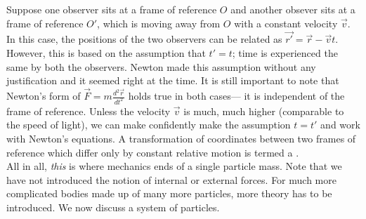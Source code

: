Suppose one observer sits at a frame of reference $O$ and another obsever sits at a frame of reference $O'$, which is moving away from $O$ with a constant velocity $\vec{v}$. In this case, the positions of the two observers can be related as $\vec{r'} = \vec{r} - \vec{v}t$. However, this is based on the assumption that $t' = t$; time is experienced the same by both the observers. Newton made this assumption without any justification and it seemed right at the time. It is still important to note that Newton's form of $\vec{F} = m \frac{d^{2} \vec{r}}{dt^{2}}$ holds true in both cases--- it is independent of the frame of reference. Unless the velocity $\vec{v}$ is much, much higher (comparable to the speed of light), we can make confidently make the assumption $t = t'$ and work with Newton's equations. A transformation of coordinates between two frames of reference which differ only by constant relative motion is termed a .\\

All in all, \textit{this} is where mechanics ends of a single particle mass. Note that we have not introduced the notion of internal or external forces. For much more complicated bodies made up of many more particles, more theory has to be introduced. We now discuss a system of particles.

